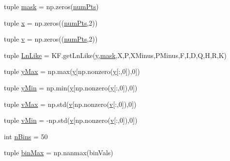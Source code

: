 \begin{DoxyCompactItemize}
\item 
tuple \hyperlink{namespace_final_analysis_a94fb4e8e60fe4cb0595dee2bbaf20c81}{mask} = np.\-zeros(\hyperlink{namespace_final_analysis_ab417da76d397a990dd95199dccc1b61b}{num\-Pts})
\item 
tuple \hyperlink{namespace_final_analysis_a53f403035b6d6abe6c7e2d7c07601b1d}{x} = np.\-zeros((\hyperlink{namespace_final_analysis_ab417da76d397a990dd95199dccc1b61b}{num\-Pts},2))
\item 
tuple \hyperlink{namespace_final_analysis_a8fb9ac591a57f2affeeb677906de4d5f}{v} = np.\-zeros((\hyperlink{namespace_final_analysis_ab417da76d397a990dd95199dccc1b61b}{num\-Pts},2))
\item 
tuple \hyperlink{namespace_final_analysis_a887a21357f13ebf746beb132e8508849}{Ln\-Like} = K\-F.\-get\-Ln\-Like(\hyperlink{namespace_final_analysis_af061a7f615d51259e7a6720b6f39f02d}{y},\hyperlink{namespace_final_analysis_a94fb4e8e60fe4cb0595dee2bbaf20c81}{mask},X,P,X\-Minus,P\-Minus,F,I,D,Q,H,R,K)
\item 
tuple \hyperlink{namespace_final_analysis_a7071cf368ec253b5f7165fa535e161ef}{y\-Max} = np.\-max(\hyperlink{namespace_final_analysis_af061a7f615d51259e7a6720b6f39f02d}{y}\mbox{[}np.\-nonzero(\hyperlink{namespace_final_analysis_af061a7f615d51259e7a6720b6f39f02d}{y}\mbox{[}\-:,0\mbox{]}),0\mbox{]})
\item 
tuple \hyperlink{namespace_final_analysis_a542cfbfe4821ac9a631cbe8102ad7de6}{y\-Min} = np.\-min(\hyperlink{namespace_final_analysis_af061a7f615d51259e7a6720b6f39f02d}{y}\mbox{[}np.\-nonzero(\hyperlink{namespace_final_analysis_af061a7f615d51259e7a6720b6f39f02d}{y}\mbox{[}\-:,0\mbox{]}),0\mbox{]})
\item 
tuple \hyperlink{namespace_final_analysis_a1876ad5867611d2150568c7311e8badb}{v\-Max} = np.\-std(\hyperlink{namespace_final_analysis_a8fb9ac591a57f2affeeb677906de4d5f}{v}\mbox{[}np.\-nonzero(\hyperlink{namespace_final_analysis_a8fb9ac591a57f2affeeb677906de4d5f}{v}\mbox{[}\-:,0\mbox{]}),0\mbox{]})
\item 
tuple \hyperlink{namespace_final_analysis_a5dff2737a91aa5a7c56b78a13ebf95ec}{v\-Min} = -\/np.\-std(\hyperlink{namespace_final_analysis_a8fb9ac591a57f2affeeb677906de4d5f}{v}\mbox{[}np.\-nonzero(\hyperlink{namespace_final_analysis_a8fb9ac591a57f2affeeb677906de4d5f}{v}\mbox{[}\-:,0\mbox{]}),0\mbox{]})
\item 
int \hyperlink{namespace_final_analysis_afbe11458d00db6f07dc367e9d9074744}{n\-Bins} = 50
\item 
tuple \hyperlink{namespace_final_analysis_ae53b90e1254d309f41585c93c7d59100}{bin\-Max} = np.\-nanmax(bin\-Vals)

\end{DoxyCompactItemize}
